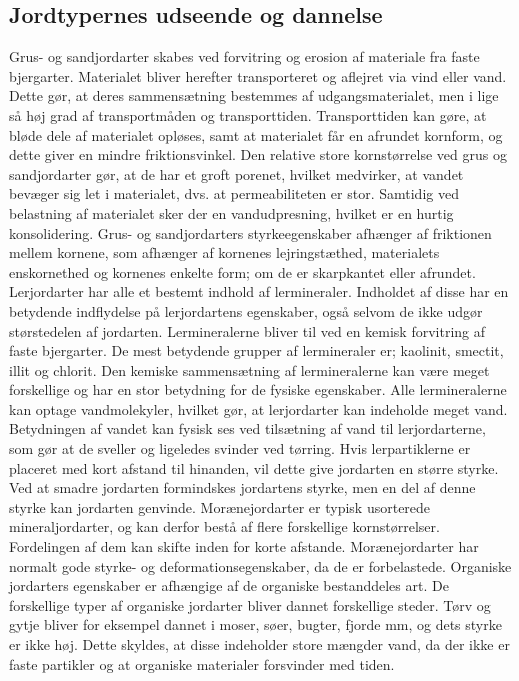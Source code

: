 \subsection{Jordtypernes udseende og dannelse}
Grus-  og sandjordarter skabes ved forvitring og erosion af materiale fra faste bjergarter. Materialet bliver herefter transporteret og aflejret via vind eller vand. Dette gør, at deres sammensætning bestemmes af udgangsmaterialet, men i lige så høj grad af transportmåden og transporttiden. Transporttiden kan gøre, at bløde dele af materialet opløses, samt at materialet får en afrundet kornform, og dette giver en mindre friktionsvinkel. Den relative store kornstørrelse ved grus og sandjordarter gør, at de har et groft porenet, hvilket medvirker, at vandet bevæger sig let i materialet,  dvs. at permeabiliteten er stor. Samtidig ved belastning af materialet sker der en vandudpresning, hvilket er en hurtig konsolidering.\citep{jordarter}
\newline \indent{     }  Grus- og sandjordarters styrkeegenskaber afhænger af friktionen mellem kornene, som afhænger af kornenes lejringstæthed, materialets enskornethed og kornenes enkelte form; om de er skarpkantet eller afrundet.\citep{jordarter} 
\newline \indent{     }  Lerjordarter har alle et bestemt indhold af lermineraler. Indholdet af disse har en betydende indflydelse på lerjordartens egenskaber, også selvom de ikke udgør størstedelen af jordarten. Lermineralerne bliver til ved en kemisk forvitring af faste bjergarter. De mest betydende grupper af lermineraler er; kaolinit, smectit, illit og chlorit. Den kemiske sammensætning af lermineralerne kan være meget forskellige og har en stor betydning for de fysiske egenskaber.\citep{jordarter} Alle lermineralerne kan optage vandmolekyler, hvilket gør, at lerjordarter kan indeholde meget vand. Betydningen af vandet kan fysisk ses ved tilsætning af vand til lerjordarterne, som gør at de sveller og ligeledes svinder ved tørring. Hvis lerpartiklerne er placeret med kort afstand til hinanden, vil dette give jordarten en større styrke.\citep{jordarter}  Ved at smadre jordarten formindskes jordartens styrke, men en del af denne styrke kan jordarten genvinde. \citep{jordarter}
\newline \indent{     }  Morænejordarter er typisk usorterede mineraljordarter, og kan derfor bestå af flere forskellige kornstørrelser. Fordelingen af dem kan skifte inden for korte afstande. Morænejordarter har normalt gode styrke- og deformationsegenskaber, da de er forbelastede.\citep{jordarter}
\newline \indent{     }  Organiske jordarters egenskaber er afhængige af de organiske bestanddeles art. De forskellige typer af organiske jordarter bliver dannet forskellige steder. Tørv og gytje bliver for eksempel dannet i moser, søer, bugter, fjorde mm, og dets styrke er ikke høj. Dette skyldes, at disse indeholder store mængder vand, da der ikke er faste partikler og at organiske materialer forsvinder med tiden. \citep{jordarter}

